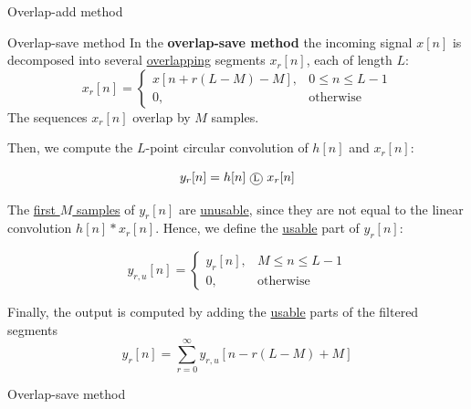 \documentclass[10pt]{beamer}
\begin{document}
%
\begin{frame}{Overlap-add method}
\begin{center}
	\resizebox{0.85\textwidth}{!}{}
\end{center}	
\end{frame}

%
\begin{frame}{Overlap-save method}
In the \textbf{overlap-save method} the incoming signal $x[n]$ is decomposed into several \underline{overlapping} segments $x_r[n]$, each of length $L$:
\begin{equation*}
x_r[n] = \begin{cases}
x[n + r(L-M)-M], & 0 \leq n \leq L-1\\
0, & \text{otherwise}
\end{cases}
\end{equation*}
The sequences $x_r[n]$ overlap by $M$ samples.

Then, we compute the $L$-point circular convolution of $h[n]$ and $x_r[n]$:

\begin{equation*}
y_r[n] = h[n]~\encircle{L}~x_r[n]
\end{equation*}

The \underline{first $M$ samples} of $y_r[n]$ are \underline{unusable}, since they are not equal to the linear convolution  $h[n]\ast x_r[n]$. Hence, we define the \underline{usable} part of $y_r[n]$:

\begin{equation*}
y_{r,u}[n] = \begin{cases}
y_r[n], & M \leq n \leq L-1 \\
0, &\text{otherwise}
\end{cases}
\end{equation*}

Finally, the output is computed by adding the \underline{usable} parts of the filtered segments
\begin{equation*}
y_r[n] = \sum_{r = 0}^{\infty} y_{r, u}[n - r(L - M) + M]
\end{equation*}
\end{frame}

%
\begin{frame}{Overlap-save method}
\begin{center}
	\resizebox{0.85\textwidth}{!}{}
\end{center}	
\end{frame}
\end{document}
